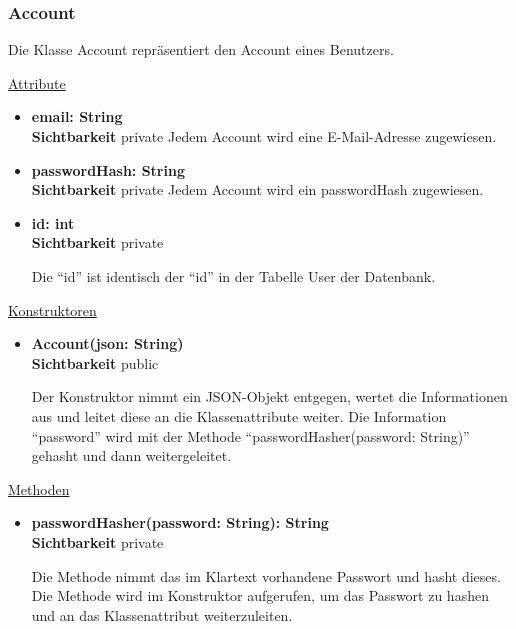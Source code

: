 \subsubsection{Account} \label{service:klasse:Account}
Die Klasse Account repräsentiert den Account eines Benutzers. \newline

\underline{Attribute}
\begin{itemize}
\itemsep0pt
\item \textbf{email: String} \hfill\\ 
\textbf{Sichtbarkeit} private 
Jedem Account wird eine E-Mail-Adresse zugewiesen.

\item \textbf{passwordHash: String} \hfill\\ 
\textbf{Sichtbarkeit} private 
Jedem Account wird ein passwordHash zugewiesen.

\item \textbf{id: int} \hfill\\ 
\textbf{Sichtbarkeit} private  

Die ``id'' ist identisch der ``id'' in der Tabelle User der Datenbank.

\end{itemize}

\underline{Konstruktoren}
\begin{itemize}
\itemsep0pt
\item \textbf{Account(json: String)} \hfill\\
\textbf{Sichtbarkeit} public

Der Konstruktor nimmt ein JSON-Objekt entgegen, wertet die Informationen aus und leitet diese an die Klassenattribute weiter. Die Information ``password'' wird mit der Methode ``passwordHasher(password: String)'' gehasht und dann weitergeleitet.

\end{itemize}

\underline{Methoden}
\begin{itemize}
\itemsep0pt
\item \textbf{passwordHasher(password: String): String}\hfill\\
\textbf{Sichtbarkeit} private

Die Methode nimmt das im Klartext vorhandene Passwort und hasht dieses. Die Methode wird im Konstruktor aufgerufen, um das Passwort zu hashen und an das Klassenattribut weiterzuleiten.

\end{itemize}